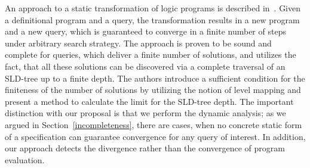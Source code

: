 An approach to a static transformation of logic programs is described in~\cite{BoundedNondeterminism}. Given a definitional program and
a query, the transformation results in a new program and a new query, which is guaranteed to converge in a finite number of steps
under arbitrary search strategy. The approach is proven to be sound and complete for queries, which deliver a finite number of solutions,
and utilizes the fact, that all these solutions can be discovered via a complete traversal of an SLD-tree up to a finite depth. The
authors introduce a sufficient condition for the finiteness of the number of solutions by utilizing the notion of level mapping and
present a method to calculate the limit for the SLD-tree depth. The important distinction with our proposal is that we perform the
dynamic analysis; as we argued in Section~\ref{incompleteness}, there are cases, when no concrete static form of a specification can
guarantee convergence for any query of interest. In addition, our approach detects the divergence rather than the
convergence of program evaluation.

